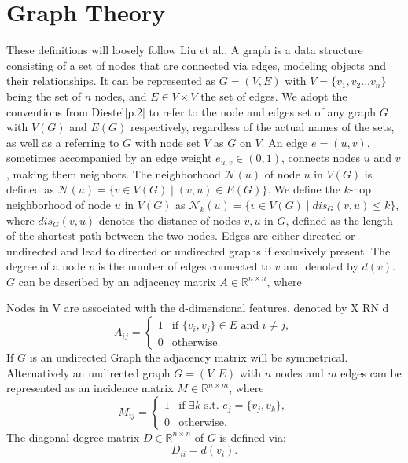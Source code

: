 \section{Graph Theory}
These definitions will loosely follow Liu et al.\cite{Liu2020}. A graph is a data structure consisting of a set of nodes that are connected via edges, modeling objects and their relationships. It can be represented as $G=(V,E)$ with $V=\{v_1,v_2...v_n\}$ being the set of $n$ nodes, and $E \in V \times V$ the set of edges. We adopt the conventions from Diestel\cite{Diestel2017}[p.2] to refer to the node and edges set of any graph $G$ with $V(G)$ and $E(G)$ respectively, regardless of the actual names of the sets, as well as a referring to $G$ with node set $V$ as $G$ on $V$. An edge $e=(u,v)$, sometimes accompanied by an edge weight $e_{u,v}\in (0,1)$, connects nodes $u$ and $v$, making them neighbors. The neighborhood $\mathcal{N}(u)$ of node $u$ in $V(G)$ is defined as $\mathcal{N}(u) = \{v \in V(G) \mid (v,u) \in E(G)\}$. We define the $k$-hop neighborhood of node $u$ in $V(G)$ as $\mathcal{N}_k(u) = \{v \in V(G) \mid dis_G(v,u) \leq k\}$, where $dis_G(v,u)$ denotes the distance of nodes $v, u$ in $G$, defined as the length of the shortest path between the two nodes. Edges are either directed or undirected and lead to directed or undirected graphs if exclusively present. The degree of a node $v$ is the number of edges connected to $v$ and denoted by $d(v)$. $G$ can be described by an adjacency matrix $A \in \mathbb{R}^{n \times n}$, where

Nodes in V are associated with the d-dimensional
features, denoted by X RN d
\begin{equation*}
    A_{ij}=\begin{cases}
        1 & \text{if } \{v_i,v_j\}\in E \text{ and } i \neq j, \\
        0 & \text{otherwise.}
    \end{cases}
\end{equation*}
If $G$ is an undirected Graph the adjacency matrix will be symmetrical. \\
Alternatively an undirected graph $ G=(V, E)$ with $n$ nodes and $m$ edges can be represented as an incidence matrix $M \in \mathbb{R}^{n \times m}$, where
\begin{equation*}
    M_{ij}=\begin{cases}
        1 & \text{if } \exists k \text{ s.t. } e_j = \{v_j, v_k\}, \\
        0 & \text{otherwise.}
    \end{cases}
\end{equation*}
The diagonal degree matrix $D\in \mathbb{R}^{n\times n}$ of $G$ is defined via:
\begin{equation*}
    D_{ii} = d(v_i).
\end{equation*}

